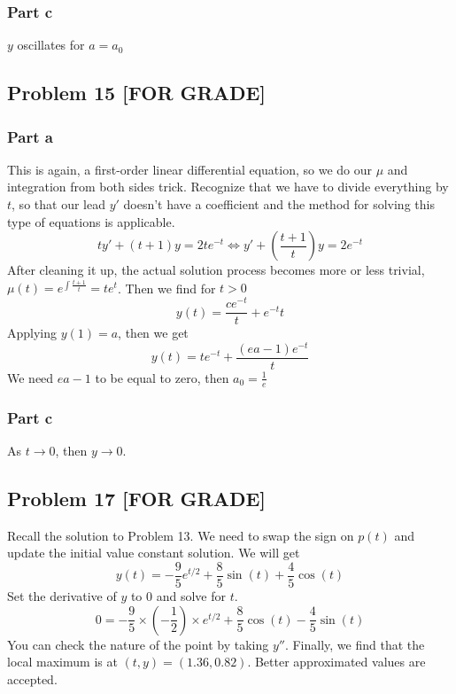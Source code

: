 \documentclass[12pt]{article}
\begin{document}
\subsubsection*{Part c}
\label{sec:org8df49dd}
\(y\) oscillates for \(a=a_0\)
\subsection*{Problem 15 [FOR GRADE]}
\label{sec:org1ce1d4a}
\subsubsection*{Part a}
\label{sec:orgebf9245}
This is again, a first-order linear differential equation, so we do our
\(\mu\) and integration from both sides trick. Recognize that we have to
divide everything by \(t\), so that our lead \(y'\) doesn't have a coefficient
and the method for solving this type of equations is applicable.
\begin{equation*}
        ty'+(t+1)y = 2 t e^{-t} \iff y' + (\frac{t+1}{t})y = 2 e^{-t}
\end{equation*}
After cleaning it up, the actual solution process becomes more or less
trivial, \(\mu(t) = e^{\int{\frac{t+1}{t}}} = te^t\). Then we find for \(t>0\)
\begin{equation*}
        y(t) = \frac{ce^{-t}}{t} + e^{-t}t
\end{equation*}
Applying \(y(1) = a\), then we get
\begin{equation*}
        y(t) = te^{-t} + \frac{(ea-1)e^{-t}}{t}
\end{equation*}
We need \(ea-1\) to be equal to zero, then \(a_0 = \frac{1}{e}\)
\subsubsection*{Part c}
\label{sec:orgd169d7a}
As \(t \to 0\), then \(y \to 0\). 
\subsection*{Problem 17 [FOR GRADE]}
\label{sec:orgbdd7153}
Recall the solution to Problem 13. We need to swap the sign on \(p(t)\) and
update the initial value constant solution. We will get
\begin{equation*}
        y(t) = -\frac{9}{5}e^{t/2}+\frac{8}{5}\sin(t)+\frac{4}{5}\cos(t)
\end{equation*}
Set the derivative of \(y\) to \(0\) and solve for \(t\).
\begin{equation*}
  0 = -\frac{9}{5}\times (-\frac{1}{2}) \times e^{t/2}+\frac{8}{5}\cos(t)-\frac{4}{5}\sin(t)
\end{equation*}
You can check the nature of the point by taking \(y''\). Finally, we find that
the local maximum is at \((t, y) = (1.36, 0.82)\). Better approximated values
are accepted.
\end{document}
